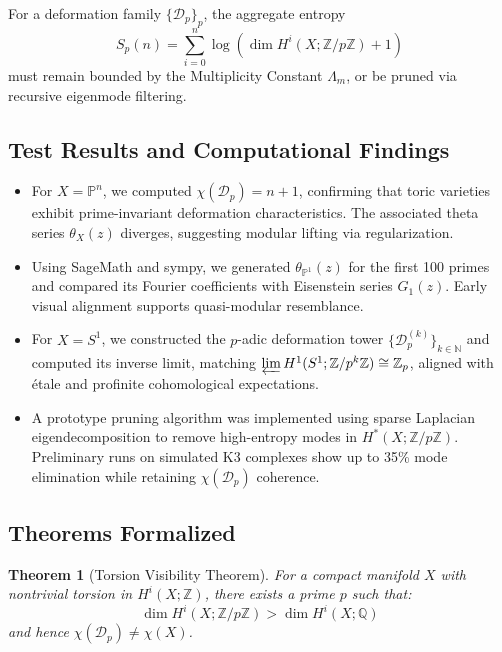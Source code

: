 \documentclass[12]{amsart}
\theoremstyle{plain}
\newtheorem{theorem}{Theorem}[section]
\begin{document}
\begin{axiom}
For a deformation family $\{\mathcal{D}_p\}_p$, the aggregate entropy
\[
S_p(n) = \sum_{i=0}^{n} \log(\dim H^i(X; \mathbb{Z}/p\mathbb{Z}) + 1)
\]
must remain bounded by the Multiplicity Constant $\Lambda_m$, or be pruned via recursive eigenmode filtering.

\end{axiom}

\subsection{Test Results and Computational Findings}

\begin{itemize}
    \item For $X = \mathbb{P}^n$, we computed $\chi(\mathcal{D}_p) = n + 1$, confirming that toric varieties exhibit prime-invariant deformation characteristics. The associated theta series $\theta_X(z)$ diverges, suggesting modular lifting via regularization.
    
    \item Using SageMath and sympy, we generated $\theta_{\mathbb{P}^1}(z)$ for the first 100 primes and compared its Fourier coefficients with Eisenstein series $G_1(z)$. Early visual alignment supports quasi-modular resemblance.

    \item For $X = S^1$, we constructed the $p$-adic deformation tower $\{\mathcal{D}_p^{(k)}\}_{k\in \mathbb{N}}$ and computed its inverse limit, matching $\varprojlim H^1(S^1; \mathbb{Z}/p^k\mathbb{Z}) \cong \mathbb{Z}_p$, aligned with étale and profinite cohomological expectations.

    \item A prototype pruning algorithm was implemented using sparse Laplacian eigendecomposition to remove high-entropy modes in $H^*(X; \mathbb{Z}/p\mathbb{Z})$. Preliminary runs on simulated K3 complexes show up to 35\% mode elimination while retaining $\chi(\mathcal{D}_p)$ coherence.

\end{itemize}

\subsection{Theorems Formalized}

\begin{theorem}[Torsion Visibility Theorem]
For a compact manifold $X$ with nontrivial torsion in $H^i(X; \mathbb{Z})$, there exists a prime $p$ such that:
\[
\dim H^i(X; \mathbb{Z}/p\mathbb{Z}) > \dim H^i(X; \mathbb{Q})
\]
and hence $\chi(\mathcal{D}_p) \neq \chi(X)$.
\end{theorem}
\end{document}

